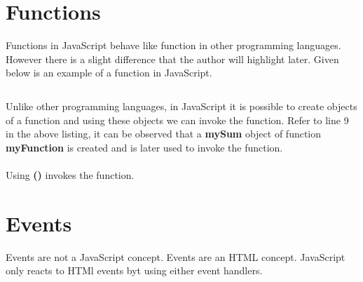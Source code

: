 \documentclass[twoside,12pt]{report}  %
\begin{document}
	
	\chapter{Functions}
	
	\noindent Functions in JavaScript behave like function in other programming languages. However there is a slight difference that the author will highlight later. Given below is an example of a function in JavaScript.
	
	\begin{listing}[H]
		\inputminted[linenos, autogobble, bgcolor=myjsbackground]{JavaScript}{../codes/js_functions.js}
	\end{listing}
	
	\noindent Unlike other programming languages, in JavaScript it is possible to create objects of a function and using these objects we can invoke the function. Refer to line 9 in the above listing, it can be observed that a \textbf{mySum} object of function \textbf{myFunction} is created and is later used to invoke the function.
	\\
	\\
	Using \textbf{()} invokes the function.
	
	
	\chapter{Events}
	
	\noindent Events are not a JavaScript concept. Events are an HTML concept. JavaScript only reacts to HTMl events byt using either event handlers.
	
	
	
	
\end{document}
